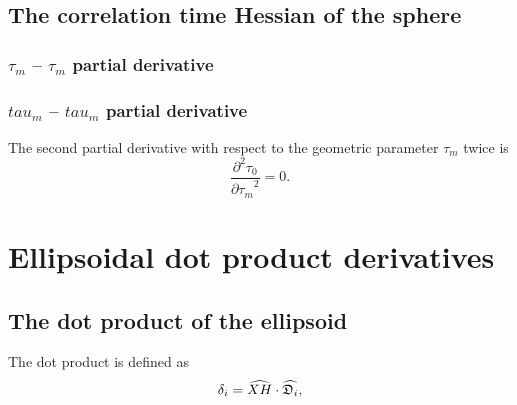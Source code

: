 \subsection{The correlation time Hessian of the sphere}


\begin{latexonly}
    \subsubsection{$\tau_m$ -- $\tau_m$ partial derivative}
\end{latexonly}
\begin{htmlonly}
    \subsubsection{$tau_m$ -- $tau_m$ partial derivative}
\end{htmlonly}

The second partial derivative with respect to the geometric parameter $\tau_m$ twice is
\begin{equation}
    \frac{\partial^2 \tau_{0}}{{\partial \tau_m}^2} = 0.
\end{equation}





\newpage
\section{Ellipsoidal dot product derivatives}




\subsection{The dot product of the ellipsoid}

The dot product is defined as
\begin{equation}
    \delta_i = \widehat{XH} \cdot \widehat{\mathfrak{D}_i},
\end{equation}

